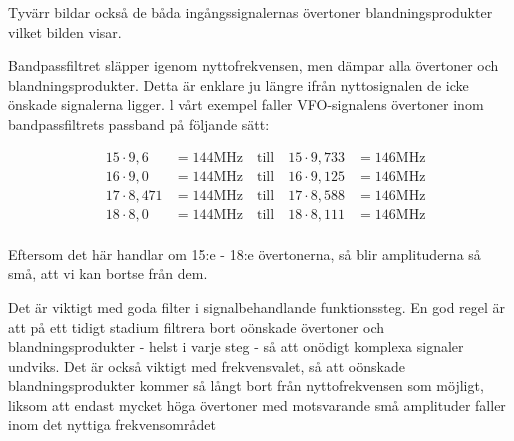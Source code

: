 Tyvärr bildar också de båda ingångssignalernas övertoner
blandningsprodukter vilket bilden visar.

Bandpassfiltret släpper igenom nyttofrekvensen, men dämpar alla
övertoner och blandningsprodukter. Detta är enklare ju längre ifrån
nyttosignalen de icke önskade signalerna ligger. l vårt exempel faller
VFO-signalens övertoner inom bandpassfiltrets passband på följande
sätt:

\begin{align*}
  &15 \cdot 9,6   &= 144 \text{MHz} \quad \text{till} \quad 15 \cdot 9,733 &= 146 \text{MHz} \\
  &16 \cdot 9,0   &= 144 \text{MHz} \quad \text{till} \quad 16 \cdot 9,125 &= 146 \text{MHz} \\
  &17 \cdot 8,471 &= 144 \text{MHz} \quad \text{till} \quad 17 \cdot 8,588 &= 146 \text{MHz} \\
  &18 \cdot 8,0   &= 144 \text{MHz} \quad \text{till} \quad 18 \cdot 8,111 &= 146 \text{MHz} \\
\end{align*}


Eftersom det här handlar om 15:e - 18:e övertonerna, så blir
amplituderna så små, att vi kan bortse från dem.

Det är viktigt med goda filter i signalbehandlande funktionssteg. En
god regel är att på ett tidigt stadium filtrera bort oönskade
övertoner och blandningsprodukter - helst i varje steg - så att
onödigt komplexa signaler undviks. Det är också viktigt med
frekvensvalet, så att oönskade blandningsprodukter kommer så långt
bort från nyttofrekvensen som möjligt, liksom att endast mycket höga
övertoner med motsvarande små amplituder faller inom det nyttiga
frekvensområdet
